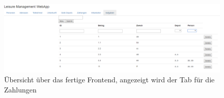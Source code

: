 \begin{figure}
\centering
\includegraphics[width=1.4\linewidth, angle=90]{4_frontend/pics/frontend_complete}
\caption{Übersicht über das fertige Frontend, angezeigt wird der Tab für die Zahlungen}
\label{fig:frontend_complete}
\end{figure}


